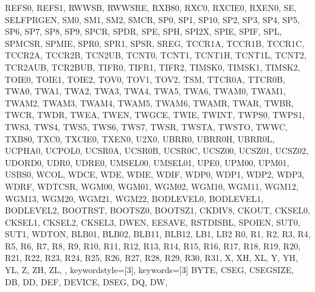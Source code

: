 {{                %
                REFS0, REFS1, RWWSB, RWWSRE, RXB80, RXC0, 
                RXCIE0, RXEN0, 
                SE, SELFPRGEN, SM0, SM1, SM2, SMCR, SP0, SP1, 
                SP10, 
                SP2, SP3, SP4, SP5, SP6, SP7, SP8, SP9, 
                SPCR, SPDR, SPE, SPH, SPI2X, SPIE, SPIF, SPL,
                SPMCSR, SPMIE, SPR0, SPR1, SPSR, SREG, 
                TCCR1A, TCCR1B, TCCR1C, TCCR2A, TCCR2B, TCN2UB,
                TCNT0, TCNT1, TCNT1H, TCNT1L, TCNT2, TCR2AUB, 
                TCR2BUB, TIFR0, TIFR1, TIFR2, TIMSK0, TIMSK1,
                TIMSK2, TOIE0, TOIE1, TOIE2, TOV0, TOV1, TOV2, 
                TSM, TTCR0A, TTCR0B, TWA0, TWA1, TWA2, TWA3, 
                TWA4, TWA5, TWA6, TWAM0, TWAM1, TWAM2, TWAM3, 
                TWAM4, TWAM5, TWAM6, TWAMR, TWAR, TWBR, TWCR, 
                TWDR, TWEA, TWEN, TWGCE, TWIE, TWINT, 
                TWPS0, TWPS1, TWS3, TWS4, TWS5, TWS6, TWS7, 
                TWSR, TWSTA, TWSTO, TWWC, TXB80, TXC0, TXCIE0, 
                TXEN0, 
                U2X0, UBRR0, UBRR0H, UBRR0L, UCPHA0, UCPOL0, 
                UCSR0A, UCSR0B, UCSR0C, UCSZ00, UCSZ01, UCSZ02,
                UDORD0, UDR0, UDRE0, UMSEL00, UMSEL01, UPE0, 
                UPM00, UPM01, USBS0, 
                WCOL, WDCE, WDE, WDIE, WDIF, WDP0, WDP1, WDP2, 
                WDP3, WDRF, WDTCSR, WGM00, WGM01, WGM02, WGM10,
                WGM11, WGM12, WGM13, WGM20, WGM21, WGM22, 
                BODLEVEL0, BODLEVEL1, BODLEVEL2, 
                BOOTRST, BOOTSZ0, BOOTSZ1, 
                CKDIV8, CKOUT, 
                CKSEL0, CKSEL1, CKSEL2, CKSEL3, 
                DWEN, EESAVE, RSTDISBL, SPOIEN, 
                SUT0, SUT1, WDTON, 
                BLB01, BLB02, BLB11, BLB12,
                LB1, LB2
                R0,  R1,  R2,  R3,  R4,  R5,  R6,  R7,  R8, 
                R9,  R10, R11, R12, R13, R14, R15, R16, R17, 
                R18, R19, R20, R21, R22, R23, R24, R25, R26, 
                R27, R28, R29, R30, R31, 
                X, XH, XL, Y, YH, YL, Z, ZH, ZL,
                },  
% 
%
  keywordstyle=[3]\color{arduinoOrange},
  keywords=[3]{  %
                BYTE,
                CSEG, CSEGSIZE,
                DB, DD, DEF, DEVICE, DSEG, DQ, DW,
}}
